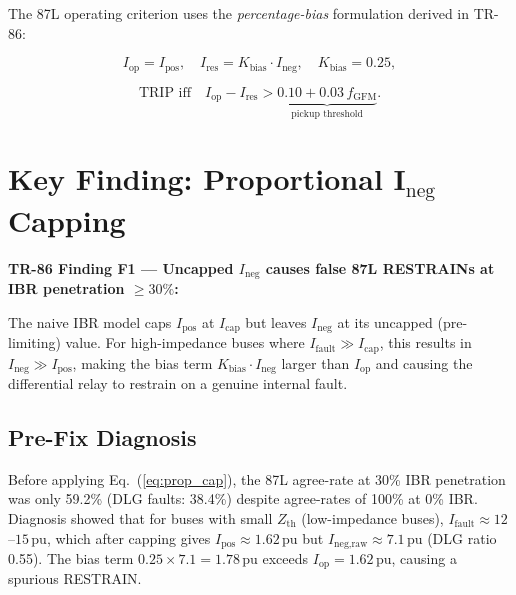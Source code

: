 \documentclass[11pt,a4paper]{article}
\newcommand{\pu}{\,\text{pu}}
\begin{document}
The 87L operating criterion uses the \emph{percentage-bias} formulation
derived in TR-86:

\begin{equation}
  I_{\text{op}} = I_{\text{pos}}, \quad
  I_{\text{res}} = K_{\text{bias}} \cdot I_{\text{neg}}, \quad
  K_{\text{bias}} = 0.25,
  \label{eq:87L_criterion}
\end{equation}

\begin{equation}
  \text{TRIP iff} \quad I_{\text{op}} - I_{\text{res}} >
  \underbrace{0.10 + 0.03\,f_{\text{GFM}}}_{\text{pickup threshold}}.
  \label{eq:87L_trip}
\end{equation}

\section{Key Finding: Proportional I\texorpdfstring{$_{\text{neg}}$}{neg}
         Capping}
\label{sec:finding_ineg}

\begin{mdframed}[style=alert]
\textbf{TR-86 Finding F1 — Uncapped $I_{\text{neg}}$ causes false
87L RESTRAINs at IBR penetration $\geq 30\%$:}

The naive IBR model caps $I_{\text{pos}}$ at $I_{\text{cap}}$ but leaves
$I_{\text{neg}}$ at its uncapped (pre-limiting) value.  For high-impedance
buses where $I_{\text{fault}} \gg I_{\text{cap}}$, this results in
$I_{\text{neg}} \gg I_{\text{pos}}$, making the bias term
$K_{\text{bias}} \cdot I_{\text{neg}}$ larger than $I_{\text{op}}$ and
causing the differential relay to restrain on a genuine internal fault.
\end{mdframed}

\subsection{Pre-Fix Diagnosis}

Before applying Eq.~(\ref{eq:prop_cap}), the 87L agree-rate at 30\% IBR
penetration was only 59.2\% (DLG faults: 38.4\%) despite agree-rates of
100\% at 0\% IBR.  Diagnosis showed that for buses with small $Z_{\text{th}}$
(low-impedance buses), $I_{\text{fault}} \approx 12$--$15\pu$, which after
capping gives $I_{\text{pos}} \approx 1.62\pu$ but $I_{\text{neg,raw}}
\approx 7.1\pu$ (DLG ratio 0.55).  The bias term $0.25 \times 7.1 = 1.78\pu$
exceeds $I_{\text{op}} = 1.62\pu$, causing a spurious RESTRAIN.
\end{document}
